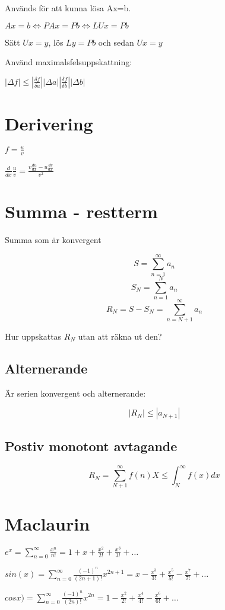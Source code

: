 \documentclass[12pt,a4paper]{article}
\begin{document}
Används för att kunna lösa Ax=b.

\Large
$Ax = b \Leftrightarrow PAx = Pb \Leftrightarrow LUx = Pb$

Sätt $Ux = y$, lös $Ly = Pb$ och sedan $Ux = y$

Använd maximalsfelsuppskattning:

\Large
$|\Delta f| \leq |\frac{\delta f}{\delta a}| |\Delta a| 
|\frac{\delta f}{\delta b}| |\Delta b|$ 

\section{Derivering}

\Large
$f = \frac{u}{v} $

$\frac{d}{dx}\frac{u}{v} = \frac{v\frac{du}{dx}-u\frac{dv}{dx}}{v^2}$

\section{Summa - restterm}
\normalsize
Summa som är konvergent

\Large
$$ S = \sum_{n=1}^{\infty} a_n $$
$$ S_N = \sum_{n=1}^{N} a_n$$
$$ R_N = S - S_N = \sum_{n=N+1}^{\infty} a_n $$


\normalsize
Hur uppskattas $R_N$ utan att räkna ut den?

\subsection{Alternerande}
Är serien konvergent och alternerande:

\Large
$$ |R_N| \leq |a_{N+1}|$$

\subsection{Postiv monotont avtagande}
$$ R_N = \sum_{N+1}^{\infty} f(n)X \leq \int_{N}^{\infty} f(x) dx $$

\normalsize
\section{Maclaurin}
\Large
$ e^x = \sum_{n=0}^{\infty} \frac{x^n}{n!} = 1 + x + \frac{x^2}{2!} + \frac{x^3}{3!} + \ldots $

$ sin(x) = \sum_{n=0}^{\infty} \frac{(-1)^n}{(2n+1)!} x^{2n+1} = x - \frac{x^3}{3!} + \frac{x^5}{5!} - \frac{x^7}{7!} + \ldots$

$ cosx) = \sum_{n=0}^{\infty} \frac{(-1)^n}{(2n)!} x^{2n} = 1 - \frac{x^2}{2!} + \frac{x^4}{4!} - \frac{x^6}{6!} + \ldots$
\end{document}
